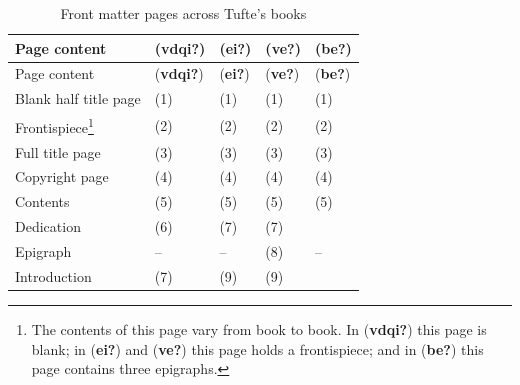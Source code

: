 \documentclass[
  twoside,
  symmetric]{tufte-book}
\begin{document}
\begin{longtable}[]{@{}
  >{\raggedright\arraybackslash}p{}
  >{\centering\arraybackslash}p{}
  >{\centering\arraybackslash}p{}
  >{\centering\arraybackslash}p{}
  >{\centering\arraybackslash}p{}@{}}
\caption{Front matter pages across Tufte's books}\tabularnewline
\toprule\noalign{}
\begin{minipage}[b]{\linewidth}\raggedright
Page content
\end{minipage} & \begin{minipage}[b]{\linewidth}\centering
(\textbf{vdqi?})
\end{minipage} & \begin{minipage}[b]{\linewidth}\centering
(\textbf{ei?})
\end{minipage} & \begin{minipage}[b]{\linewidth}\centering
(\textbf{ve?})
\end{minipage} & \begin{minipage}[b]{\linewidth}\centering
(\textbf{be?})
\end{minipage} \\
\midrule\noalign{}
\endfirsthead
\toprule\noalign{}
\begin{minipage}[b]{\linewidth}\raggedright
Page content
\end{minipage} & \begin{minipage}[b]{\linewidth}\centering
(\textbf{vdqi?})
\end{minipage} & \begin{minipage}[b]{\linewidth}\centering
(\textbf{ei?})
\end{minipage} & \begin{minipage}[b]{\linewidth}\centering
(\textbf{ve?})
\end{minipage} & \begin{minipage}[b]{\linewidth}\centering
(\textbf{be?})
\end{minipage} \\
\midrule\noalign{}
\endhead
\bottomrule\noalign{}
\endlastfoot
Blank half title page & (1) & (1) & (1) & (1) \\
Frontispiece\footnote{The contents of this page vary from book to book.
  In (\textbf{vdqi?}) this page is blank; in (\textbf{ei?}) and
  (\textbf{ve?}) this page holds a frontispiece; and in (\textbf{be?})
  this page contains three epigraphs.} & (2) & (2) & (2) & (2) \\
Full title page & (3) & (3) & (3) & (3) \\
Copyright page & (4) & (4) & (4) & (4) \\
Contents & (5) & (5) & (5) & (5) \\
Dedication & (6) & (7) & (7) & 7 \\
Epigraph & -- & -- & (8) & -- \\
Introduction & (7) & (9) & (9) & 9 \\
\end{longtable}
\end{document}
